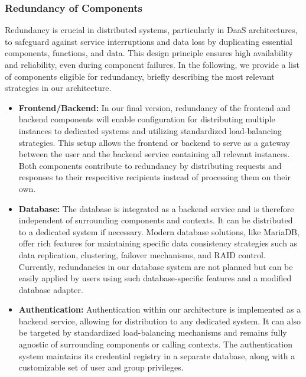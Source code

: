\documentclass[runningheads]{llncs}
\begin{document}
\subsubsection{Redundancy of Components}

Redundancy is crucial in distributed systems,
particularly in DaaS architectures,
to safeguard against service interruptions and data loss
by duplicating essential components, functions, and data.
This design principle ensures high availability and reliability,
even during component failures.
In the following, we provide a list of components eligible for redundancy,
briefly describing the most relevant strategies in our architecture.

\begin{itemize}
	\item \textbf{Frontend/Backend:}
	      In our final version,
	      redundancy of the frontend and backend components
	      will enable configuration for distributing multiple instances
	      to dedicated systems and utilizing standardized load-balancing strategies.
	      This setup allows the frontend or backend
	      to serve as a gateway between the user and the backend service
	      containing all relevant instances.
	      Both components contribute to redundancy
	      by distributing requests and responses to their respecitive recipients
	      instead of processing them on their own.
	\item \textbf{Database:}
	      The database is integrated as a backend service
	      and is therefore independent of surrounding components and contexts.
	      It can be distributed to a dedicated system if necessary.
	      Modern database solutions, like MariaDB,
	      offer rich features for maintaining specific data consistency strategies
	      such as data replication, clustering, failover mechanisms,
	      and RAID control.
	      Currently, redundancies in our database system are not planned
	      but can be easily applied by users using such database-specific features
	      and a modified database adapter.
	\item \textbf{Authentication: }
	      Authentication within our architecture is implemented as a backend service,
	      allowing for distribution to any dedicated system.
	      It can also be targeted by standardized load-balancing mechanisms
	      and remains fully agnostic of surrounding components
	      or calling contexts.
	      The authentication system maintains its credential registry
	      in a separate database, along with a customizable set
	      of user and group privileges.

\end{itemize}
\end{document}
